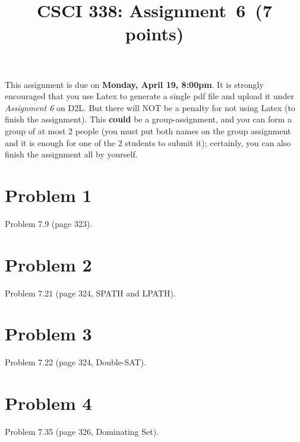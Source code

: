 \documentclass[11pt]{article}
\begin{document}
\date{}

\title{CSCI 338: Assignment~6~(7 points)}



\maketitle

\noindent
This assignment is due on {\bf Monday, April 19, 8:00pm}. It is strongly
encouraged that you use Latex to generate a single pdf file and upload it
under {\em Assignment 6} on D2L. But there will NOT be a penalty for not
using Latex (to finish the assignment). This {\bf could} be a
group-assignment, and you can form a group of at most 2 people (you must put
both names on the group assignment and it is enough for one of the 2 students
to submit it); certainly, you can also finish the assignment all by yourself.

\section*{Problem 1}

Problem 7.9 (page 323).
\newline

\section*{Problem 2}

Problem 7.21 (page 324, SPATH and LPATH).
\newline

\section*{Problem 3}

Problem 7.22 (page 324, Double-SAT).
\newline

\section*{Problem 4}

Problem 7.35 (page 326, Dominating Set).
\end{document}
